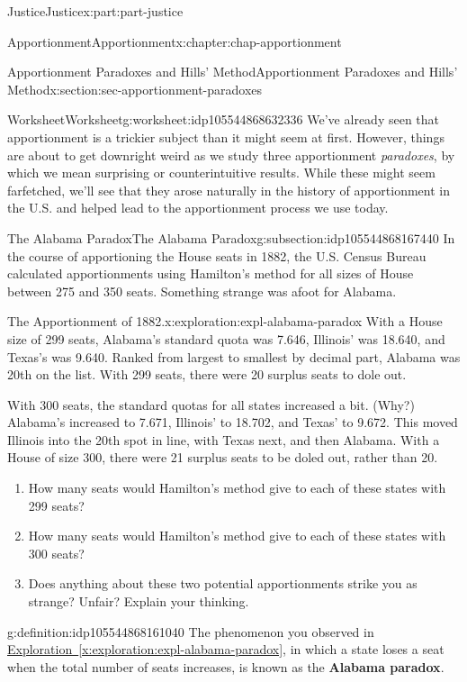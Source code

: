 \documentclass[oneside,10pt,]{book}
\newcommand{\xreffont}{\relax}
\newcommand{\terminology}[1]{\textbf{#1}}
\numberwithin{equation}{section}
\begin{document}
\begin{partptx}{Justice}{}{Justice}{}{}{x:part:part-justice}
\begin{chapterptx}{Apportionment}{}{Apportionment}{}{}{x:chapter:chap-apportionment}
\begin{sectionptx}{Apportionment Paradoxes and Hills' Method}{}{Apportionment Paradoxes and Hills' Method}{}{}{x:section:sec-apportionment-paradoxes}
\begin{worksheet-subsection}{Worksheet}{}{Worksheet}{}{}{g:worksheet:idp105544868632336}
We've already seen that apportionment is a trickier subject than it might seem at first. However, things are about to get downright weird as we study three apportionment \emph{paradoxes}, by which we mean surprising or counterintuitive results. While these might seem farfetched, we'll see that they arose naturally in the history of apportionment in the U.S. and helped lead to the apportionment process we use today.%
%
%
\typeout{************************************************}
\typeout{************************************************}
%
\begin{subsectionptx}{The Alabama Paradox}{}{The Alabama Paradox}{}{}{g:subsection:idp105544868167440}
In the course of apportioning the House seats in 1882, the U.S. Census Bureau calculated apportionments using Hamilton's method for all sizes of House between 275 and 350 seats. Something strange was afoot for Alabama.%
\begin{exploration}{The Apportionment of 1882.}{x:exploration:expl-alabama-paradox}%
With a House size of 299 seats, Alabama's standard quota was 7.646, Illinois' was 18.640, and Texas's was 9.640. Ranked from largest to smallest by decimal part, Alabama was 20th on the list. With 299 seats, there were 20 surplus seats to dole out.%
\par
With 300 seats, the standard quotas for all states increased a bit. (Why?) Alabama's increased to 7.671, Illinois' to 18.702, and Texas' to 9.672. This moved Illinois into the 20th spot in line, with Texas next, and then Alabama. With a House of size 300, there were 21 surplus seats to be doled out, rather than 20.%
%
\begin{enumerate}[label=(\alph*)]
\item{}How many seats would Hamilton's method give to each of these states with 299 seats?%
\vspace{1in}
\item{}How many seats would Hamilton's method give to each of these states with 300 seats?%
\vspace{1in}
\item{}Does anything about these two potential apportionments strike you as strange? Unfair? Explain your thinking.%
\vspace{1in}
\end{enumerate}
\end{exploration}%
\begin{definition}{}{g:definition:idp105544868161040}%
The phenomenon you observed in \hyperref[x:exploration:expl-alabama-paradox]{Exploration~{\xreffont\ref{x:exploration:expl-alabama-paradox}}}, in which a state loses a seat when the total number of seats increases, is known as the \terminology{Alabama paradox}.%

\end{definition}
\end{subsectionptx}
\end{worksheet-subsection}
\end{sectionptx}
\end{chapterptx}
\end{partptx}
\end{document}
